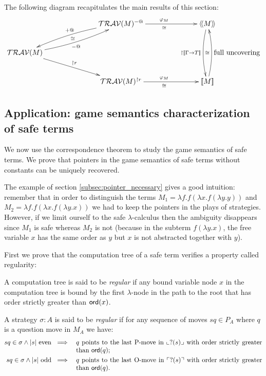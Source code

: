 The following diagram recapitulates the main results of this section:
$$
\xymatrix @C=6pc{
                                           & \travset(M)^{-@} \ar@/_/[dl]_{+@}  \ar[r]^{\varphi_M}_\cong & \intersem{M} \ar@/_/[dd]_{\upharpoonright \sem{\Gamma\rightarrow T}} \\
\travset(M) \ar@/_/[ur]_{-@}^{\cong} \ar[dr]^{\upharpoonright r}  \\
                                           & \travset(M)^{\upharpoonright r} \ar[r]^{\varphi_M}_\cong & \sem{M} \ar@/_/[uu]^{\cong}_{\mbox{full uncovering}}
}
$$



\subsection{Application: game semantics characterization of safe terms}
We now use the correspondence theorem to study the game semantics of
safe terms. We prove that pointers in the game semantics of
safe terms without constants can be uniquely recovered.

The example of section \ref{subsec:pointer_necessary} gives a good
intuition: remember that in order to distinguish the terms
$M_1 = \lambda f . f (\lambda x . f (\lambda y .y ))$ and
$M_2 = \lambda f . f (\lambda x . f (\lambda y .x ))$ we had to keep the pointers in the plays of strategies.
However, if we limit ourself to the safe $\lambda$-calculus then the
ambiguity disappears since $M_1$ is safe whereas $M_2$ is not (because
in the subterm $f (\lambda y . x)$, the free variable $x$ has the same
order as $y$ but $x$ is not abstracted together with $y$).

First we prove that the computation tree of a safe term verifies a
property called regularity:

\begin{dfn}
A computation tree is said to be \emph{regular} if any bound variable node $x$ in the computation tree is bound
by the first $\lambda$-node in the path to the root that has
order strictly greater than ${\sf ord}(x)$.
\end{dfn}


\begin{dfn}
A strategy $\sigma : A$ is said to be \emph{regular} if for any sequence of moves $s q \in P_A$
where $q$ is a question move in $M_A$ we have:
\begin{eqnarray*}
s q \in \sigma \wedge |s| \mbox{ even } &\implies& \parbox[t]{10cm}{$q$ points to the last P-move in $\oview{?(s)}$ with order strictly greater than $\ord{q}$;} \\
s q \in \sigma \wedge |s| \mbox{ odd } &\implies& \parbox[t]{10cm}{$q$  points to the last O-move in $\pview{?(s)}$ with order strictly greater than $\ord{q}$.}
\end{eqnarray*}
\end{dfn}

